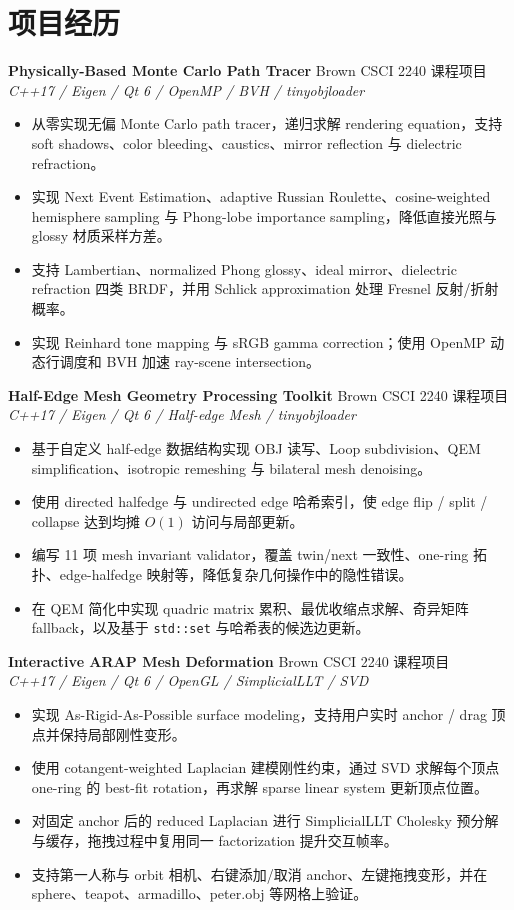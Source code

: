 \documentclass[10pt,fontset=none]{ctexart}
\newcommand{\project}[3]{
  \textbf{#1} \hfill #2\\
  \textit{#3}
}
\begin{document}
\section*{项目经历}

\project{Physically-Based Monte Carlo Path Tracer}{Brown CSCI 2240 课程项目}{C++17 / Eigen / Qt 6 / OpenMP / BVH / tinyobjloader}
\begin{itemize}
  \item 从零实现无偏 Monte Carlo path tracer，递归求解 rendering equation，支持 soft shadows、color bleeding、caustics、mirror reflection 与 dielectric refraction。
  \item 实现 Next Event Estimation、adaptive Russian Roulette、cosine-weighted hemisphere sampling 与 Phong-lobe importance sampling，降低直接光照与 glossy 材质采样方差。
  \item 支持 Lambertian、normalized Phong glossy、ideal mirror、dielectric refraction 四类 BRDF，并用 Schlick approximation 处理 Fresnel 反射/折射概率。
  \item 实现 Reinhard tone mapping 与 sRGB gamma correction；使用 OpenMP 动态行调度和 BVH 加速 ray-scene intersection。
\end{itemize}

\project{Half-Edge Mesh Geometry Processing Toolkit}{Brown CSCI 2240 课程项目}{C++17 / Eigen / Qt 6 / Half-edge Mesh / tinyobjloader}
\begin{itemize}
  \item 基于自定义 half-edge 数据结构实现 OBJ 读写、Loop subdivision、QEM simplification、isotropic remeshing 与 bilateral mesh denoising。
  \item 使用 directed halfedge 与 undirected edge 哈希索引，使 edge flip / split / collapse 达到均摊 $O(1)$ 访问与局部更新。
  \item 编写 11 项 mesh invariant validator，覆盖 twin/next 一致性、one-ring 拓扑、edge-halfedge 映射等，降低复杂几何操作中的隐性错误。
  \item 在 QEM 简化中实现 quadric matrix 累积、最优收缩点求解、奇异矩阵 fallback，以及基于 \texttt{std::set} 与哈希表的候选边更新。
\end{itemize}

\project{Interactive ARAP Mesh Deformation}{Brown CSCI 2240 课程项目}{C++17 / Eigen / Qt 6 / OpenGL / SimplicialLLT / SVD}
\begin{itemize}
  \item 实现 As-Rigid-As-Possible surface modeling，支持用户实时 anchor / drag 顶点并保持局部刚性变形。
  \item 使用 cotangent-weighted Laplacian 建模刚性约束，通过 SVD 求解每个顶点 one-ring 的 best-fit rotation，再求解 sparse linear system 更新顶点位置。
  \item 对固定 anchor 后的 reduced Laplacian 进行 SimplicialLLT Cholesky 预分解与缓存，拖拽过程中复用同一 factorization 提升交互帧率。
  \item 支持第一人称与 orbit 相机、右键添加/取消 anchor、左键拖拽变形，并在 sphere、teapot、armadillo、peter.obj 等网格上验证。
\end{itemize}
\end{document}
